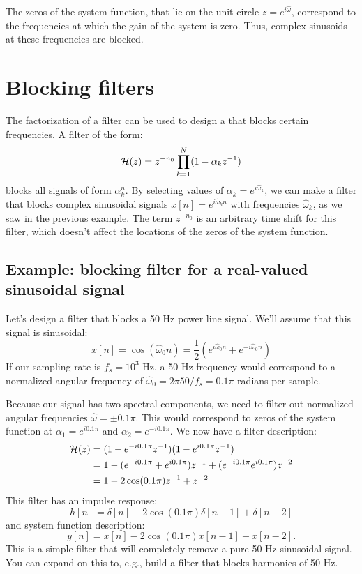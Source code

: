 The zeros of the system function, that lie on the unit circle $z=e^{i\hat{\omega}}$, correspond to the frequencies at which
the gain of the system is zero. Thus, complex sinusoids at these frequencies are blocked.


\section{Blocking filters}

The factorization of a filter can be used to design a  that blocks certain frequencies. A filter of the
form:
\begin{equation}
  \mathcal{H}(z) = z^{-n_0}\prod_{k=1}^{N} (1-\alpha_k z^{-1})
  \label{eq:blocking_filter}
\end{equation}
blocks all signals of form $\alpha_k^n$. By selecting values of
$\alpha_k = e^{i\hat{\omega}_k}$, we can make a filter that blocks
complex sinusoidal signals $x[n]=e^{i\hat{\omega}_k n}$ with
frequencies $\hat{\omega}_k$, as we saw in the previous example. The
term $z^{-n_0}$ is an arbitrary time shift for this filter, which
doesn't affect the locations of the zeros of the system function.

\subsection{Example: blocking filter for a real-valued sinusoidal signal}

Let's design a filter that blocks a 50 Hz power line signal. We'll assume that this signal is sinusoidal:
\begin{equation}
  x[n]=\cos(\hat{\omega}_0 n) = \frac{1}{2}(e^{i\hat{\omega}_0 n}+e^{-i\hat{\omega}_0 n})
\end{equation}
If our sampling rate is $f_s=10^3$ Hz, a 50 Hz frequency would
correspond to a normalized angular frequency of $\hat{\omega}_0=2\pi 50/f_s = 0.1\pi$ radians per sample.

Because our signal has two spectral components, we need to filter out
normalized angular frequencies $\hat{\omega}=\pm 0.1\pi$. This would
correspond to zeros of the system function at $\alpha_1=e^{i0.1\pi}$
and $\alpha_2=e^{-i0.1\pi}$. We now have a filter description:
\begin{align}
  \mathcal{H}(z) & = (1-e^{-i 0.1 \pi} z^{-1})(1-e^{i 0.1 \pi} z^{-1})                         \\
       & = 1 - (e^{-i0.1\pi} + e^{i0.1\pi})z^{-1} + (e^{-i0.1\pi} e^{i0.1\pi})z^{-2} \\
       & =1 - 2\cos(0.1\pi)z^{-1} + z^{-2}
\end{align}
This filter has an impulse response:
\begin{equation}
  h[n] = \delta[n] -2\cos(0.1\pi)\delta[n-1] + \delta[n-2]
\end{equation}
and system function description:
\begin{equation}
  y[n] = x[n] - 2\cos(0.1\pi)x[n-1]+x[n-2].
\end{equation}
This is a simple filter that will completely remove a pure 50 Hz
sinusoidal signal. You can expand on this to, e.g., build a filter that
blocks harmonics of 50 Hz.



